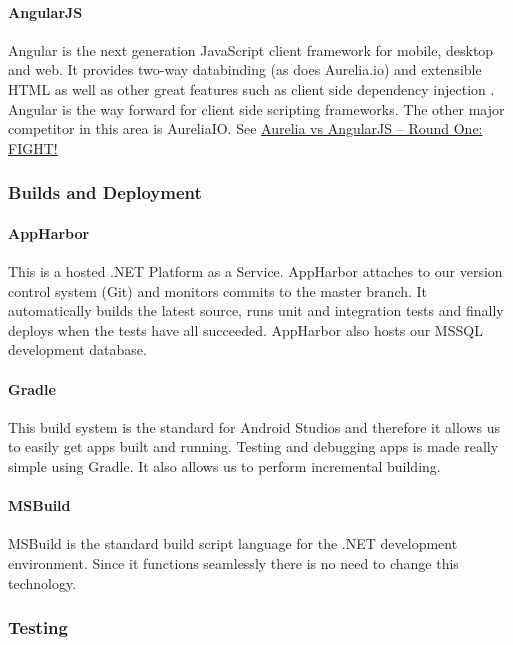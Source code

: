 \documentclass[11pt,a4paper,titlepage]{article}
\begin{document}
			\paragraph{AngularJS}
				Angular is the next generation JavaScript client framework for mobile, desktop and web. It provides two-way databinding (as does Aurelia.io) and extensible HTML as well as other great features such as client side dependency injection
				. Angular is the way forward for client side scripting frameworks. The other major competitor in this area is AureliaIO. See \href{http://ilikekillnerds.com/2015/01/aurelia-vs-angularjs-round-one-fight/}{Aurelia vs AngularJS – Round One: FIGHT!}
		\subsubsection{Builds and Deployment}		
			\paragraph{AppHarbor}
				This is a hosted .NET Platform as a Service. AppHarbor attaches to our version control system (Git) and monitors commits to the master branch. It automatically builds the latest source, runs unit and integration tests and finally deploys when the tests have all succeeded. AppHarbor also hosts our MSSQL development database.
			\paragraph{Gradle}
				This build system is the standard for Android Studios and therefore it allows us to easily get apps built and running. Testing and debugging apps is made really simple using Gradle. It also allows us to perform incremental building. 
			\paragraph{MSBuild}
				MSBuild is the standard build script language for the .NET development environment. Since it functions seamlessly there is no need to change this technology.
		\subsubsection{Testing}
\end{document}

